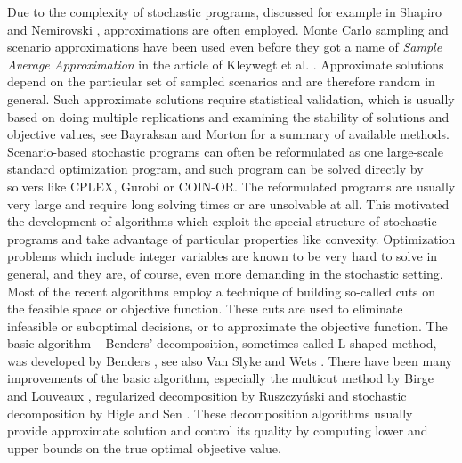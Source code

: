 \documentclass{article}              %
\begin{document}
Due to the complexity of stochastic programs,  discussed for example in Shapiro and Nemirovski \cite{complexity}, approximations are often employed. Monte Carlo sampling and scenario approximations have been used even before they got a name of \emph{Sample Average Approximation} in the article of Kleywegt et al. \cite{saa}. Approximate solutions depend on the particular set of sampled scenarios and are therefore random in general. Such approximate solutions require statistical validation, which is usually based on doing multiple replications and examining the stability of solutions and objective values, see Bayraksan and Morton \cite{bayraksan_morton_2011} for a summary of available methods. Scenario-based stochastic programs can often be reformulated as one large-scale standard optimization program, and such program can be solved directly by solvers like CPLEX, Gurobi or COIN-OR. The reformulated programs are usually very large and require long solving times or are unsolvable at all. This motivated the development of algorithms which exploit the special structure of stochastic programs and take advantage of particular properties like convexity. Optimization problems which include integer variables are known to be very hard to solve in general, and they are, of course, even more demanding in the stochastic setting. Most of the recent algorithms employ a technique of building so-called cuts on the feasible space or objective function. These cuts are used to eliminate infeasible or suboptimal decisions, or to approximate the objective function. The basic algorithm -- Benders' decomposition, sometimes called L-shaped method, was developed by Benders \cite{benders}, see also Van Slyke and Wets \cite{slyke_wets}. There have been many improvements of the basic algorithm, especially the multicut method by Birge and Louveaux \cite{birge_multicut}, regularized decomposition by Ruszczy{\'n}ski \cite{regular_decomp} and stochastic decomposition by Higle and Sen \cite{stochdecomp_2stage}. These decomposition algorithms usually provide approximate solution and control its quality by computing lower and upper bounds on the true optimal objective value.
\end{document}
